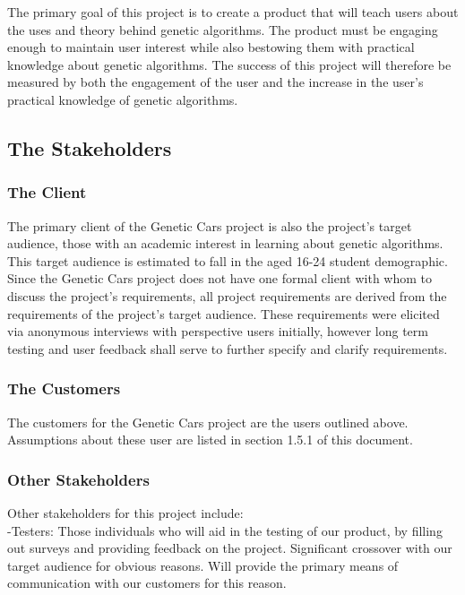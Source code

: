 \documentclass[12pt, titlepage]{article}
\begin{document}
The primary goal of this project is to create a product that will teach users 
about the uses and theory behind genetic algorithms. The product must be 
engaging enough to maintain user interest while also bestowing them with 
practical knowledge about genetic algorithms. The success of this project will 
therefore be measured by both the engagement of the user and the increase in the 
user's practical knowledge of genetic algorithms.

\subsection{The Stakeholders}

\subsubsection{The Client}

The primary client of the Genetic Cars project is also the project's target 
audience, those with an academic interest in learning about genetic algorithms. 
This target audience is estimated to fall in the aged 16-24 student demographic. 
Since the Genetic Cars project does not have one formal client with whom to 
discuss the project's requirements, all project requirements are derived from 
the requirements of the project's target audience. These requirements were 
elicited via anonymous interviews with perspective users initially, however long 
term testing and user feedback shall serve to further specify and clarify 
requirements.

\subsubsection{The Customers}

The customers for the Genetic Cars project are the users outlined above. 
Assumptions about these user are listed in section 1.5.1 of this document.

\subsubsection{Other Stakeholders}

Other stakeholders for this project include:\\

-Testers: Those individuals who will aid in the testing of our product, by 
filling out surveys and providing feedback on the project. Significant crossover 
with our target audience for obvious reasons. Will provide the primary means of 
communication with our customers for this reason.\\
\end{document}
